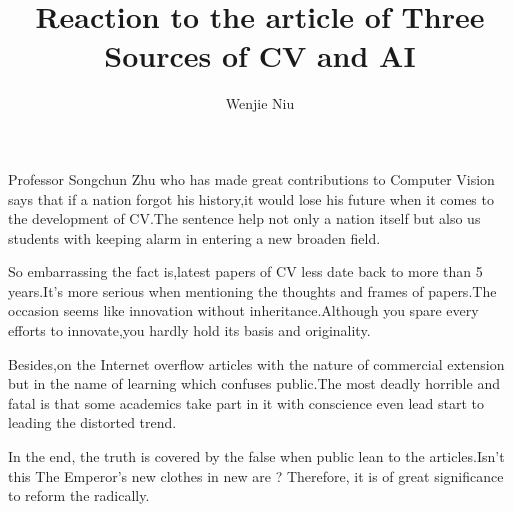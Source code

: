 \documentclass{article}
\author{Wenjie Niu}
\title{Reaction to the article of Three Sources of CV and AI}
\begin{document}
 
  \maketitle 
    Professor Songchun Zhu who has made great contributions to Computer Vision says that if a nation forgot his history,it would lose his future when it comes to the development of CV.The sentence help not only a nation itself but also us students with keeping alarm in entering a new broaden field.

So embarrassing the fact is,latest papers of CV less date back to more than 5 years.It’s more serious when mentioning the thoughts and frames of papers.The occasion seems like innovation without inheritance.Although you spare every efforts to innovate,you hardly hold its basis and originality.

Besides,on the Internet overflow articles with the nature of commercial extension but in the name of learning which confuses public.The most deadly horrible and fatal is that some academics take part in it with conscience even lead start to leading the distorted trend.

In the end, the truth is covered by the false when public lean to the articles.Isn’t this The Emperor’s new clothes in new are ? Therefore, it is of great significance to reform the radically. 
\end{document}
